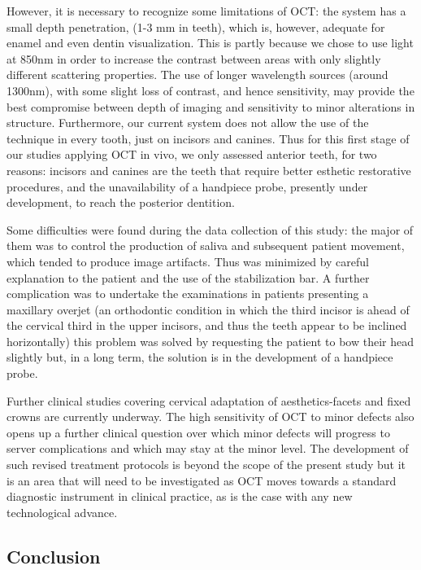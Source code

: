 \documentclass[12pt,twoside,english]{book}
\renewcommand{\~}{\perispomeni}%
\numberwithin{equation}{section}
\numberwithin{figure}{section}
\begin{document}
However, it is necessary to recognize some limitations of OCT: the system has a small depth penetration, (1-3 mm in teeth), which is, however, adequate for enamel and even dentin visualization. This is partly because we chose to use light at 850nm in order to increase the contrast between areas with only slightly different scattering properties. The use of longer wavelength sources (around 1300nm), with some slight loss of contrast, and hence sensitivity, may provide the best compromise between depth of imaging and sensitivity to minor alterations in structure. Furthermore, our current system does not allow the use of the technique in every tooth, just on incisors and canines. Thus for this first stage of our studies applying OCT in vivo, we only assessed anterior teeth, for two reasons: incisors and canines are the teeth that require better esthetic restorative procedures, and the unavailability of a handpiece probe, presently under development, to reach the posterior dentition.

Some difficulties were found during the data collection of this study: the major of them was to control the production of saliva and subsequent patient movement, which tended to produce image artifacts. Thus was minimized by careful explanation to the patient and the use of the stabilization bar. A further complication was to undertake the examinations in patients presenting a maxillary overjet (an orthodontic condition in which the third incisor is ahead of the cervical third in the upper incisors, and thus the teeth appear to be inclined horizontally) \textendash{} this problem was solved by requesting the patient to bow their head slightly but, in a long term, the solution is in the development of a handpiece probe.

Further clinical studies covering cervical adaptation of aesthetics-facets and fixed crowns are currently underway. The high sensitivity of OCT to minor defects also opens up a further clinical question over which minor defects will progress to server complications and which may stay at the minor level. The development of such revised treatment protocols is beyond the scope of the present study but it is an area that will need to be investigated as OCT moves towards a standard diagnostic instrument in clinical practice, as is the case with any new technological advance.

\subsection{Conclusion}
\end{document}
